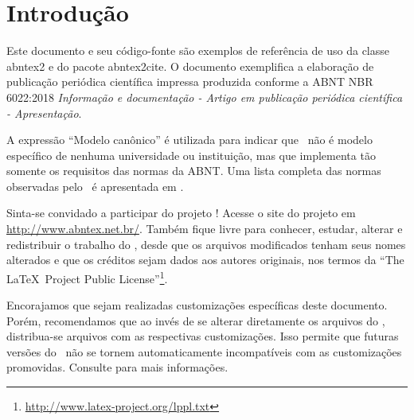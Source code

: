\documentclass[
	article,			%
	11pt,				%
	oneside,			%
	a4paper,			%
	chapter=TITLE,		%
	english,			%
	brazil,				%
	sumario=tradicional
	]{abntex2}
\begin{document}

\frenchspacing


\maketitle



\textual

\section*{Introdução}

Este documento e seu código-fonte são exemplos de referência de uso da classe
\textsf{abntex2} e do pacote \textsf{abntex2cite}. O documento exemplifica a
elaboração de publicação periódica científica impressa produzida conforme a
ABNT NBR 6022:2018 \emph{Informação e documentação - Artigo em publicação
   periódica científica - Apresentação}.

A expressão ``Modelo canônico'' é utilizada para indicar que \abnTeX\ não é
modelo específico de nenhuma universidade ou instituição, mas que implementa
tão somente os requisitos das normas da ABNT. Uma lista completa das normas
observadas pelo \abnTeX\ é apresentada em .

Sinta-se convidado a participar do projeto \abnTeX! Acesse o site do projeto em
\url{http://www.abntex.net.br/}. Também fique livre para conhecer, estudar,
alterar e redistribuir o trabalho do \abnTeX, desde que os arquivos modificados
tenham seus nomes alterados e que os créditos sejam dados aos autores
originais, nos termos da ``The \LaTeX\ Project Public
License''\footnote{\url{http://www.latex-project.org/lppl.txt}}.

Encorajamos que sejam realizadas customizações específicas deste documento.
Porém, recomendamos que ao invés de se alterar diretamente os arquivos do
\abnTeX, distribua-se arquivos com as respectivas customizações. Isso permite
que futuras versões do \abnTeX~não se tornem automaticamente incompatíveis com
as customizações promovidas. Consulte 
para mais informações.
\end{document}
